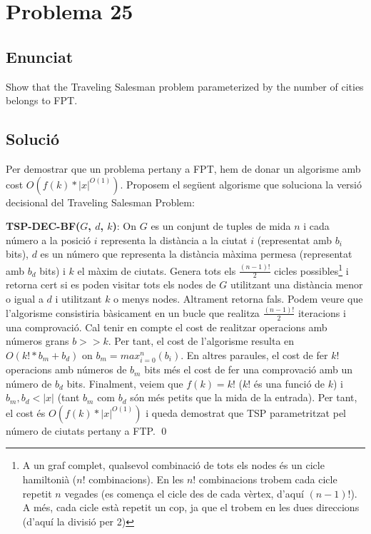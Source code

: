\section{Problema 25}
\subsection{Enunciat}
Show that the Traveling Salesman problem parameterized by the number of cities belongs to FPT.
\subsection{Solució}
Per demostrar que un problema pertany a FPT, hem de donar un algorisme amb cost $O(f(k)*|x|^{O(1)})$.
Proposem el següent algorisme que soluciona la versió decisional del Traveling Salesman Problem:
\newline
\par
\textbf{TSP-DEC-BF($G$, $d$, $k$)}: On $G$ es un conjunt de tuples de mida $n$ i cada número a la posició $i$ representa la distància a la ciutat $i$ (representat amb $b_i$ bits), $d$ es un número que representa la distància màxima permesa (representat amb $b_d$ bits) i $k$ el màxim de ciutats. Genera tots els $\frac{(n-1)!}{2}$ cicles possibles\footnote{A un graf complet, qualsevol combinació de tots els nodes és un cicle hamiltonià ($n!$ combinacions). En les $n!$ combinacions trobem cada cicle repetit $n$ vegades (es comença el cicle des de cada vèrtex, d'aquí $(n-1)!$). A més, cada cicle està repetit un cop, ja que el trobem en les dues direccions (d'aquí la divisió per 2)} i retorna cert si es poden visitar tots els nodes de $G$ utilitzant una distància menor o igual a $d$ i utilitzant $k$ o menys nodes. Altrament retorna fals.
\newline
\newline
Podem veure que l'algorisme consistiria bàsicament en un bucle que realitza $\frac{(n-1)!}{2}$ iteracions i una comprovació. Cal tenir en compte el cost de realitzar operacions amb números grans $b>>k$. Per tant, el cost de l'algorisme resulta en $O(k!*b_m+b_d)$ on $b_m = max_{i=0}^{n}(b_i)$. En altres paraules, el cost de fer $k!$ operacions amb números de $b_m$ bits més el cost de fer una comprovació amb un número de $b_d$ bits. Finalment, veiem que $f(k) = k!$ ($k!$ és una funció de $k$) i $b_m, b_d < |x|$ (tant $b_m$ com $b_d$ són més petits que la mida de la entrada). Per tant, el cost és $O(f(k)*|x|^{O(1)})$ i queda demostrat que TSP parametritzat pel número de ciutats pertany a FTP.
\qed
